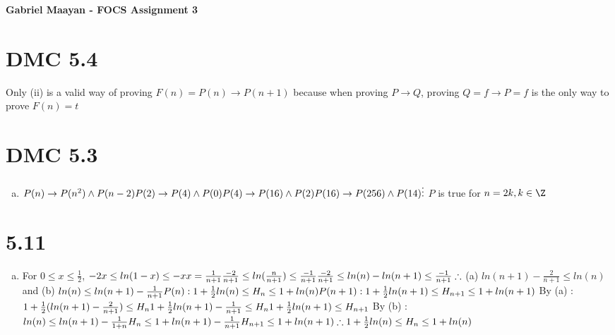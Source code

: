 \documentclass[]{article}
\def\math#1{$#1$}
\begin{document}
\bf \Large Gabriel Maayan - FOCS Assignment 3

\section{DMC 5.4}
Only (ii) is a valid way of proving \math{F(n)=P(n)\to P(n+1)}
because when proving \math{P\to Q}, proving \math{Q=f\to P=f} 
is the only way to prove \math{F(n) = t}


\section{DMC 5.3}
\begin{enumerate}[(c)]
\item \math{P(n)\to P(n^2)\land P(n-2)
\\ P(2)\to P(4)\land P(0)
\\ P(4)\to P(16)\land P(2)
\\ P(16)\to P(256)\land P(14)
\\ \vdots
\\} \math{P} is true for \math{n=2k, k\in \Z}

\end{enumerate}
\section{5.11}
\begin{enumerate}[(b)]
\item For \math{0\leq x\leq \frac{1}{2}}, \math{-2x\leq ln(1-x)\leq -x
\\ x=\frac{1}{n+1}
\\ \frac{-2}{n+1}\leq ln(\frac{n}{n+1})\leq \frac{-1}{n+1}
\\ \frac{-2}{n+1}\leq ln(n)-ln(n+1)\leq \frac{-1}{n+1}
\\ \therefore} (a) \math{ ln(n+1) - \frac{2}{n+1} \leq ln(n)} and (b) \math{ln(n)\leq ln(n+1)-\frac{1}{n+1}
\\ \\ P(n) : 1+\frac{1}{2}ln(n) \leq H_n \leq 1+ln(n)
\\ P(n+1) : 1+\frac{1}{2}ln(n+1) \leq H_{n+1} \leq 1+ln(n+1)
\\ \\} By (a) : \math{1+\frac{1}{2}(ln(n+1)-\frac{2}{n+1})\leq H_n
\\ 1+\frac{1}{2}ln(n+1)-\frac{1}{n+1}\leq H_n
\\ 1+\frac{1}{2}ln(n+1)\leq H_{n+1}
\\ \\} By (b) : \math{ln(n)\leq ln(n+1) -\frac{1}{1+n}
\\ H_n\leq 1+ln(n+1)-\frac{1}{n+1}
\\ H_{n+1}\leq 1+ln(n+1)
\\ \therefore 1+\frac{1}{2}ln(n) \leq H_n \leq 1+ln(n)}


\end{enumerate}
\end{document}
